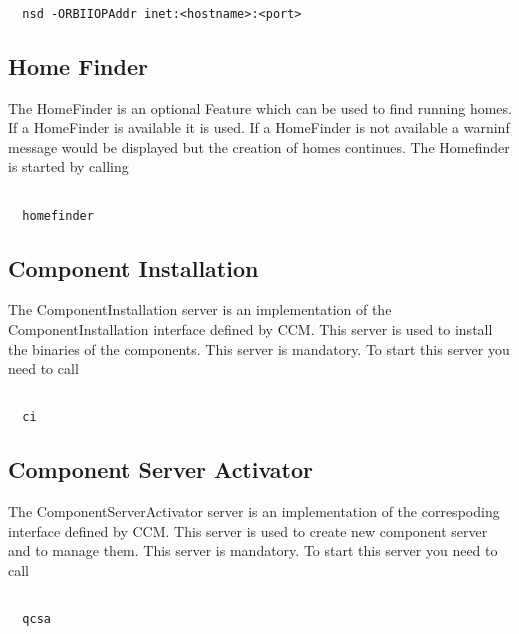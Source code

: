 \documentclass[12pt,a4paper]{report}
\begin{document}
\small
\begin{verbatim}

  nsd -ORBIIOPAddr inet:<hostname>:<port>

\end{verbatim}
\normalsize

\subsection{Home Finder}
\label{sec:HomeFinder}

The HomeFinder is an optional Feature which can be used to find running homes. If a HomeFinder is available it is used. If a HomeFinder is not available a warninf message would be displayed but the creation of homes continues. The Homefinder is started by calling

\small
\begin{verbatim}

  homefinder

\end{verbatim}
\normalsize

\subsection{Component Installation}
\label{sec:ComponentInstallation}
The ComponentInstallation server is an implementation of the ComponentInstallation interface defined by CCM. This server is used to install the binaries of the components. This server is mandatory. To start this server you need to call

\small
\begin{verbatim}

  ci

\end{verbatim}
\normalsize

\subsection{Component Server Activator}
\label{sec:ComponentServerActivator}

The ComponentServerActivator server is an implementation of the correspoding interface defined by CCM. This server is used to create new component server and to manage them. This server is mandatory. To start this server you need to call 

\small
\begin{verbatim}

  qcsa

\end{verbatim}
\normalsize
\end{document}
